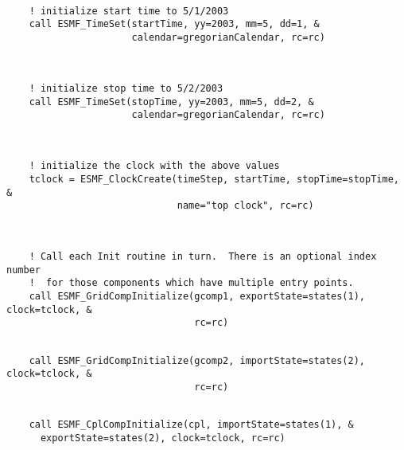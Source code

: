  \begin{verbatim}

    ! initialize start time to 5/1/2003
    call ESMF_TimeSet(startTime, yy=2003, mm=5, dd=1, &
                      calendar=gregorianCalendar, rc=rc)
 
\end{verbatim}
 

 \begin{verbatim}

    ! initialize stop time to 5/2/2003
    call ESMF_TimeSet(stopTime, yy=2003, mm=5, dd=2, &
                      calendar=gregorianCalendar, rc=rc)
 
\end{verbatim}
 

 \begin{verbatim}

    ! initialize the clock with the above values
    tclock = ESMF_ClockCreate(timeStep, startTime, stopTime=stopTime, &
                              name="top clock", rc=rc)
 
\end{verbatim}
 

 \begin{verbatim}
     
    ! Call each Init routine in turn.  There is an optional index number
    !  for those components which have multiple entry points.
    call ESMF_GridCompInitialize(gcomp1, exportState=states(1), clock=tclock, &
                                 rc=rc)
 
\end{verbatim}
 

 \begin{verbatim}
    call ESMF_GridCompInitialize(gcomp2, importState=states(2), clock=tclock, &
                                 rc=rc)
 
\end{verbatim}
 

 \begin{verbatim}
    call ESMF_CplCompInitialize(cpl, importState=states(1), &
      exportState=states(2), clock=tclock, rc=rc)
 
\end{verbatim}
 
